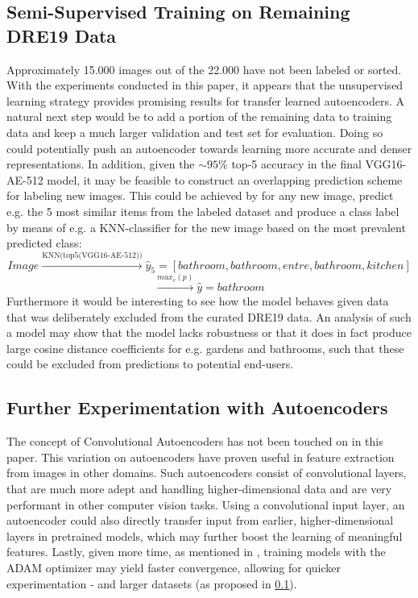 \subsection{Semi-Supervised Training on Remaining DRE19 Data} \label{sec:fwork1}
Approximately 15.000 images out of the 22.000 have not been labeled or sorted. 
With the experiments conducted in this paper, it appears that the unsupervised learning strategy provides promising results for transfer learned autoencoders.
A natural next step would be to add a portion of the remaining data to training data and keep a much larger validation and test set for evaluation.
Doing so could potentially push an autoencoder towards learning more accurate and denser representations. 
\newline
\newline
In addition, given the $\sim 95\%$ top-5 accuracy in the final VGG16-AE-512 model, it may be feasible to construct an overlapping prediction scheme for labeling new images.
This could be achieved by for any new image, predict e.g. the 5 most similar items from the labeled dataset and produce a class label by means of e.g. a KNN-classifier for the new image based on the most prevalent predicted class:
$$
Image \xrightarrow{\text{KNN(top5(VGG16-AE-512))}} \hat{y}_{5} = [bathroom, bathroom, entre, bathroom, kitchen]
$$
$$
\xrightarrow{\text{$max_{c}(p)$}}  \hat{y} = bathroom 
$$
\newline
Furthermore it would be interesting to see how the model behaves given data that was deliberately excluded from the curated DRE19 data. 
An analysis of such a model may show that the model lacks robustness or that it does in fact produce large cosine distance coefficients for e.g. gardens and bathrooms, such that these could be excluded from predictions to potential end-users.

\subsection{Further Experimentation with Autoencoders}
The concept of Convolutional Autoencoders has not been touched on in this paper. 
This variation on autoencoders have proven useful in feature extraction from images\autocite{MAGGIPINTO2018126} in other domains.
Such autoencoders consist of convolutional layers, that are much more adept and handling higher-dimensional data and are very performant in other computer vision tasks.
Using a convolutional input layer, an autoencoder could also directly transfer input from earlier, higher-dimensional layers in pretrained models, which may further boost the learning of meaningful features. 
\newline
\newline
Lastly, given more time, as mentioned in , training models with the ADAM optimizer may yield faster convergence, allowing for quicker experimentation - and larger datasets (as proposed in \ref{sec:fwork1}).

